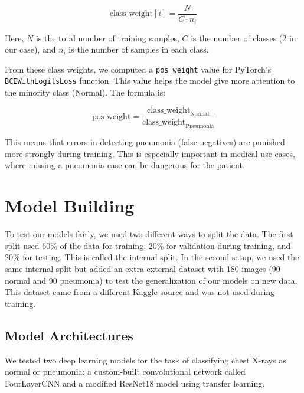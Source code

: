 \documentclass[a4paper,11pt]{article}
\begin{document}
\[
\text{class\_weight}[i] = \frac{N}{C \cdot n_i}
\]

Here, \(N\) is the total number of training samples, \(C\) is the number of classes (2 in our case), and \(n_i\) is the number of samples in each class.

From these class weights, we computed a \texttt{pos\_weight} value for PyTorch’s \texttt{BCEWithLogitsLoss} function. This value helps the model give more attention to the minority class (Normal). The formula is:

\[
\text{pos\_weight} = \frac{\text{class\_weight}_{\text{Normal}}}{\text{class\_weight}_{\text{Pneumonia}}}
\]

This means that errors in detecting pneumonia (false negatives) are punished more strongly during training. This is especially important in medical use cases, where missing a pneumonia case can be dangerous for the patient.

\section{Model Building}
To test our models fairly, we used two different ways to split the data. The first split used 60\% of the data for training, 20\% for validation during training, and 20\% for testing. This is called the internal split. In the second setup, we used the same internal split but added an extra external dataset with 180 images (90 normal and 90 pneumonia) to test the generalization of our models on new data. This dataset came from a different Kaggle source and was not used during training.

\subsection{Model Architectures}
We tested two deep learning models for the task of classifying chest X-rays as normal or pneumonia: a custom-built convolutional network called FourLayerCNN and a modified ResNet18 model using transfer learning.
\end{document}
